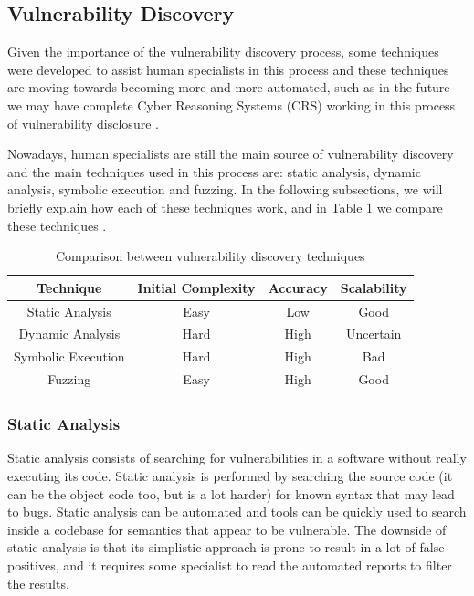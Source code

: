 \subsection{Vulnerability Discovery}
\label{subsec:vuln-disc}

Given the importance of the vulnerability discovery process, some techniques were developed to assist human specialists in this process and these techniques are moving towards becoming more and more automated, such as in the future we may have complete Cyber Reasoning Systems (CRS) working in this process of vulnerability disclosure \cite{crs}.

Nowadays, human specialists are still the main source of vulnerability discovery and the main techniques used in this process are: static analysis, dynamic analysis, symbolic execution and fuzzing. In the following subsections, we will briefly explain how each of these techniques work, and in Table \ref{tab:disc-techniques} we compare these techniques \cite{fuzzing}.

\begin{table}[h]
    \centering
    \caption{Comparison between vulnerability discovery techniques}
        \begin{tabular}{|c|c|c|c|}
        \hline
        \textbf{Technique}   & \textbf{Initial Complexity} & \textbf{Accuracy} & \textbf{Scalability} \\ \hline
        Static Analysis    & Easy      & Low   & Good         \\ 
        Dynamic Analysis   & Hard      & High  & Uncertain    \\ 
        Symbolic Execution & Hard      & High  & Bad          \\ 
        Fuzzing            & Easy      & High  & Good         \\ \hline
        \end{tabular}%
    \label{tab:disc-techniques}
\end{table}

\subsubsection{Static Analysis}

Static analysis consists of searching for vulnerabilities in a software without really executing its code. Static analysis is performed by searching the source code (it can be the object code too, but is a lot harder) for known syntax that may lead to bugs. Static analysis can be automated and tools can be quickly used to search inside a codebase for semantics that appear to be vulnerable. The downside of static analysis is that its simplistic approach is prone to result in a lot of false-positives, and it requires some specialist to read the automated reports to filter the results.

